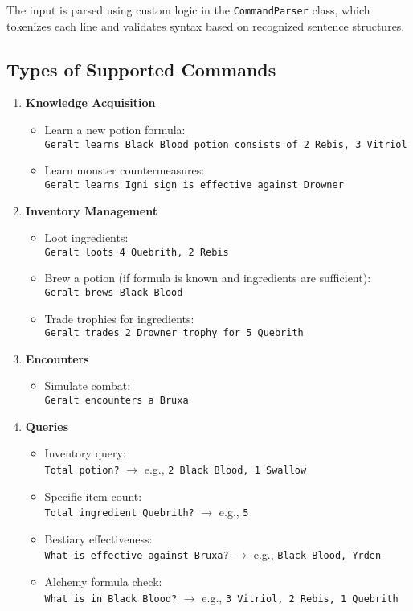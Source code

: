 \documentclass{article}
\begin{document}
The input is parsed using custom logic in the \texttt{CommandParser} class, which tokenizes each line and validates syntax based on recognized sentence structures.

\subsection*{Types of Supported Commands}
\begin{enumerate}
  \item \textbf{Knowledge Acquisition}
    \begin{itemize}
      \item Learn a new potion formula: \\
        \texttt{Geralt learns Black Blood potion consists of 2 Rebis, 3 Vitriol}
      \item Learn monster countermeasures: \\
        \texttt{Geralt learns Igni sign is effective against Drowner}
    \end{itemize}

  \item \textbf{Inventory Management}
    \begin{itemize}
      \item Loot ingredients: \\
        \texttt{Geralt loots 4 Quebrith, 2 Rebis}
      \item Brew a potion (if formula is known and ingredients are sufficient): \\
        \texttt{Geralt brews Black Blood}
      \item Trade trophies for ingredients: \\
        \texttt{Geralt trades 2 Drowner trophy for 5 Quebrith}
    \end{itemize}
    \newpage
    

  \item \textbf{Encounters}
    \begin{itemize}
      \item Simulate combat: \\
        \texttt{Geralt encounters a Bruxa}
    \end{itemize}

  \item \textbf{Queries}
    \begin{itemize}
      \item Inventory query: \\
        \texttt{Total potion?}  $\rightarrow$ e.g., \texttt{2 Black Blood, 1 Swallow}
      \item Specific item count: \\
        \texttt{Total ingredient Quebrith?} $\rightarrow$ e.g., \texttt{5}
      \item Bestiary effectiveness: \\
        \texttt{What is effective against Bruxa?} $\rightarrow$ e.g., \texttt{Black Blood, Yrden}
      \item Alchemy formula check: \\
        \texttt{What is in Black Blood?} $\rightarrow$ e.g., \texttt{3 Vitriol, 2 Rebis, 1 Quebrith}
    \end{itemize}


\end{enumerate}
\end{document}
